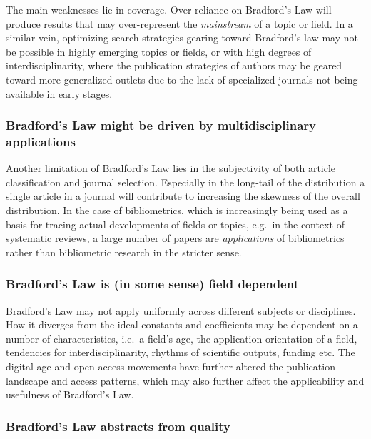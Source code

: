 \documentclass[
  letterpaper,
]{scrreprt}
\begin{document}
The main weaknesses lie in coverage. Over-reliance on Bradford's Law
will produce results that may over-represent the \emph{mainstream} of a
topic or field. In a similar vein, optimizing search strategies gearing
toward Bradford's law may not be possible in highly emerging topics or
fields, or with high degrees of interdisciplinarity, where the
publication strategies of authors may be geared toward more generalized
outlets due to the lack of specialized journals not being available in
early stages.

\subsubsection{Bradford's Law might be driven by multidisciplinary
applications}\label{bradfords-law-might-be-driven-by-multidisciplinary-applications}

Another limitation of Bradford's Law lies in the subjectivity of both
article classification and journal selection. Especially in the
long-tail of the distribution a single article in a journal will
contribute to increasing the skewness of the overall distribution. In
the case of bibliometrics, which is increasingly being used as a basis
for tracing actual developments of fields or topics, e.g.~in the context
of systematic reviews, a large number of papers are \emph{applications}
of bibliometrics rather than bibliometric research in the stricter
sense.

\subsubsection{Bradford's Law is (in some sense) field
dependent}\label{bradfords-law-is-in-some-sense-field-dependent}

Bradford's Law may not apply uniformly across different subjects or
disciplines. How it diverges from the ideal constants and coefficients
may be dependent on a number of characteristics, i.e.~a field's age, the
application orientation of a field, tendencies for interdisciplinarity,
rhythms of scientific outputs, funding etc. The digital age and open
access movements have further altered the publication landscape and
access patterns, which may also further affect the applicability and
usefulness of Bradford's Law.

\subsubsection{Bradford's Law abstracts from
quality}\label{bradfords-law-abstracts-from-quality}
\end{document}

